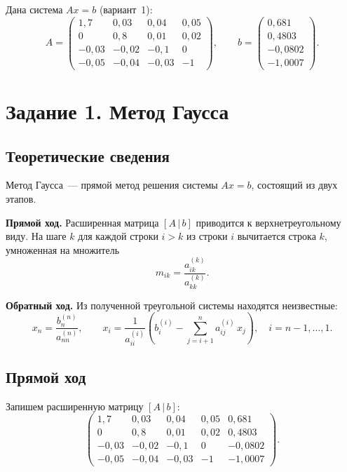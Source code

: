 \documentclass[a4paper, final]{article}
\begin{document}
Дана система $Ax = b$ (вариант~1):
\[
A = \begin{pmatrix}
1{,}7   & 0{,}03  & 0{,}04  & 0{,}05 \\
0       & 0{,}8   & 0{,}01  & 0{,}02 \\
-0{,}03 & -0{,}02 & -0{,}1  & 0      \\
-0{,}05 & -0{,}04 & -0{,}03 & -1
\end{pmatrix}, \qquad
b = \begin{pmatrix}
0{,}681 \\ 0{,}4803 \\ -0{,}0802 \\ -1{,}0007
\end{pmatrix}.
\]

\newpage

\section{Задание 1. Метод Гаусса}

\subsection{Теоретические сведения}

Метод Гаусса~--- прямой метод решения системы $Ax = b$, состоящий из двух этапов.

\textbf{Прямой ход.} Расширенная матрица $[A\,|\,b]$ приводится к верхнетреугольному
виду. На шаге $k$ для каждой строки $i > k$ из строки $i$ вычитается строка $k$,
умноженная на множитель
\[
m_{ik} = \frac{a_{ik}^{(k)}}{a_{kk}^{(k)}}.
\]

\textbf{Обратный ход.} Из полученной треугольной системы находятся неизвестные:
\[
x_n = \frac{b_n^{(n)}}{a_{nn}^{(n)}}, \qquad
x_i = \frac{1}{a_{ii}^{(i)}}\!\left(b_i^{(i)} - \sum_{j=i+1}^{n} a_{ij}^{(i)}\,x_j\right),
\quad i = n-1, \ldots, 1.
\]

\subsection{Прямой ход}

Запишем расширенную матрицу $[A\,|\,b]$:
\[
\left(\begin{array}{cccc|c}
1{,}7   & 0{,}03  & 0{,}04  & 0{,}05 & 0{,}681  \\
0       & 0{,}8   & 0{,}01  & 0{,}02 & 0{,}4803 \\
-0{,}03 & -0{,}02 & -0{,}1  & 0      & -0{,}0802 \\
-0{,}05 & -0{,}04 & -0{,}03 & -1     & -1{,}0007
\end{array}\right).
\]
\end{document}
